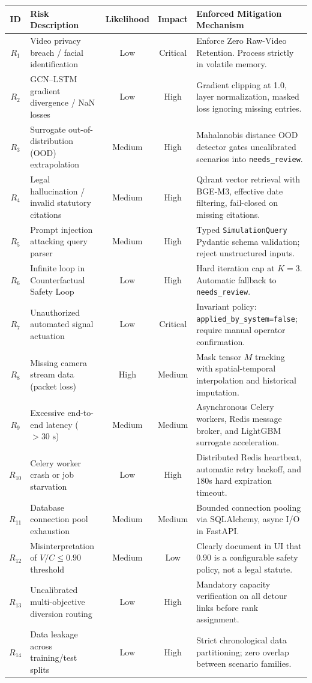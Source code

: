 \begin{longtable}{|c|p{4.2cm}|c|c|p{6.2cm}|}
\hline
\rowcolor{blue!10}
\textbf{ID} & \textbf{Risk Description} & \textbf{Likelihood} & \textbf{Impact} & \textbf{Enforced Mitigation Mechanism} \\
\hline
\endhead

$R_1$ & Video privacy breach / facial identification & Low & Critical & Enforce Zero Raw-Video Retention. Process strictly in volatile memory. \\
\hline
$R_2$ & GCN--LSTM gradient divergence / NaN losses & Low & High & Gradient clipping at 1.0, layer normalization, masked loss ignoring missing entries. \\
\hline
$R_3$ & Surrogate out-of-distribution (OOD) extrapolation & Medium & High & Mahalanobis distance OOD detector gates uncalibrated scenarios into \texttt{needs\_review}. \\
\hline
$R_4$ & Legal hallucination / invalid statutory citations & Medium & High & Qdrant vector retrieval with BGE-M3, effective date filtering, fail-closed on missing citations. \\
\hline
$R_5$ & Prompt injection attacking query parser & Medium & High & Typed \texttt{SimulationQuery} Pydantic schema validation; reject unstructured inputs. \\
\hline
$R_6$ & Infinite loop in Counterfactual Safety Loop & Low & High & Hard iteration cap at $K=3$. Automatic fallback to \texttt{needs\_review}. \\
\hline
$R_7$ & Unauthorized automated signal actuation & Low & Critical & Invariant policy: \texttt{applied\_by\_system=false}; require manual operator confirmation. \\
\hline
$R_8$ & Missing camera stream data (packet loss) & High & Medium & Mask tensor $M$ tracking with spatial-temporal interpolation and historical imputation. \\
\hline
$R_9$ & Excessive end-to-end latency ($> 30\text{ s}$) & Medium & Medium & Asynchronous Celery workers, Redis message broker, and LightGBM surrogate acceleration. \\
\hline
$R_{10}$ & Celery worker crash or job starvation & Low & High & Distributed Redis heartbeat, automatic retry backoff, and 180s hard expiration timeout. \\
\hline
$R_{11}$ & Database connection pool exhaustion & Medium & Medium & Bounded connection pooling via SQLAlchemy, async I/O in FastAPI. \\
\hline
$R_{12}$ & Misinterpretation of $V/C \le 0.90$ threshold & Medium & Low & Clearly document in UI that 0.90 is a configurable safety policy, not a legal statute. \\
\hline
$R_{13}$ & Uncalibrated multi-objective diversion routing & Low & High & Mandatory capacity verification on all detour links before rank assignment. \\
\hline
$R_{14}$ & Data leakage across training/test splits & Low & High & Strict chronological data partitioning; zero overlap between scenario families. \\
\hline
\end{longtable}
